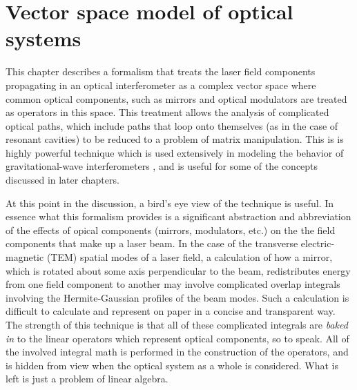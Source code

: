 \chapter{Vector space model of optical systems}
\label{ch:modalmodel}
This chapter describes a formalism that treats the laser field components propagating in an optical interferometer as a complex vector space where common optical components, such as mirrors and optical modulators are treated as operators in this space. %
This treatment allows the analysis of complicated optical paths, which include paths that loop onto themselves (as in the case of resonant cavities) to be reduced to a problem of matrix manipulation. %
This is is highly powerful technique which is used extensively in modeling the behavior of gravitational-wave interferometers \cite{Vinet1986,Hefetz:97,Sigg:00}, and is useful for some of the concepts discussed in later chapters.

At this point in the discussion, a bird's eye view of the technique is useful. %
In essence what this formalism provides is a significant abstraction and abbreviation of the effects of opical components (mirrors, modulators, etc.) on the the field components that make up a laser beam. %
In the case of the transverse electric-magnetic (TEM) spatial modes of a laser field, a calculation of how a mirror, which is rotated about some axis perpendicular to the beam, redistributes energy from one field component to another may involve complicated overlap integrals involving the Hermite-Gaussian profiles of the beam modes. %
Such a calculation is difficult to calculate and represent on paper in a concise and transparent way. %
The strength of this technique is that all of these complicated integrals are \emph{baked in} to the linear operators which represent optical components, so to speak. %
All of the involved integral math is performed in the construction of the operators, and is hidden from view when the optical system as a whole is considered. %
What is left is just a problem of linear algebra.

